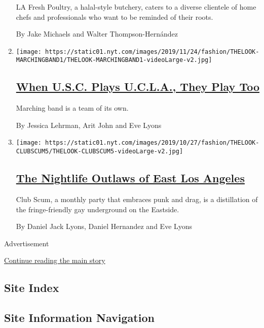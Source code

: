 \begin{enumerate}
  LA Fresh Poultry, a halal-style butchery, caters to a diverse
  clientele of home chefs and professionals who want to be reminded of
  their roots.

  By Jake Michaels and Walter Thompson-Hernández
\item
  \texttt{[image: https://static01.nyt.com/images/2019/11/24/fashion/THELOOK-MARCHINGBAND1/THELOOK-MARCHINGBAND1-videoLarge-v2.jpg]}

  \hypertarget{when-usc-plays-ucla-they-play-too}{%
  \subsection{\texorpdfstring{\href{/2019/11/23/style/usc-ucla-marching-band.html}{When
  U.S.C. Plays U.C.L.A., They Play
  Too}}{When U.S.C. Plays U.C.L.A., They Play Too}}\label{when-usc-plays-ucla-they-play-too}}

  Marching band is a team of its own.

  By Jessica Lehrman, Arit John and Eve Lyons
\item
  \texttt{[image: https://static01.nyt.com/images/2019/10/27/fashion/THELOOK-CLUBSCUM5/THELOOK-CLUBSCUM5-videoLarge-v2.jpg]}

  \hypertarget{the-nightlife-outlaws-of-east-los-angeles}{%
  \subsection{\texorpdfstring{\href{/2019/10/19/style/the-nightlife-outlaws-of-east-los-angeles.html}{The
  Nightlife Outlaws of East Los
  Angeles}}{The Nightlife Outlaws of East Los Angeles}}\label{the-nightlife-outlaws-of-east-los-angeles}}

  Club Scum, a monthly party that embraces punk and drag, is a
  distillation of the fringe-friendly gay underground on the Eastside.

  By Daniel Jack Lyons, Daniel Hernandez and Eve Lyons
\end{enumerate}

Advertisement

\protect\hyperlink{after-mid6}{Continue reading the main story}

\hypertarget{site-index}{%
\subsection{Site Index}\label{site-index}}

\hypertarget{site-information-navigation}{%
\subsection{Site Information
Navigation}\label{site-information-navigation}}

